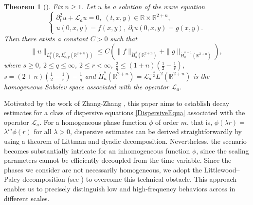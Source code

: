 \documentclass[a4paper,11pt, reqno]{amsart}
\numberwithin{equation}{section}
\theoremstyle{plain}
\newtheorem{theorem}{Theorem}[section]
\theoremstyle{definition}
\theoremstyle{remark}
\begin{document}
\begin{theorem}[\cite{Zhang-Zhang}] \label{wave-Strichartz} Fix $n\geq1$. Let $u$ be a solution of the wave equation 
\begin{equation}\label{Schrodinger}
	\begin{cases}	\partial^2_tu+\mathcal{L}_a u=0,\; (t,x,y)\in\mathbb{R}\times\mathbb{R}^{2+n},\\
	u(0,x,y)=f(x,y),\;\partial_tu(0,x,y)=g(x,y).
	\end{cases}
	\end{equation}
Then there exists a constant $C>0$ such that
\begin{equation*}
\|u\|_{L_t^q(\mathbb{R},L_{x,y}^r(\mathbb{R}^{2+n}))}\leq C\left(\|f\|_{\dot{H}_a^s(\mathbb{R}^{2+n})}+\|g\|_{\dot{H}_a^{s-1}(\mathbb{R}^{2+n})}\right),
\end{equation*}
where $s\geq0$, $2\leq q\leq \infty$, $2\leq r<\infty$, $\frac{2}{q}\leq (1+n)\left(\frac{1}{2}-\frac{1}{r}\right)$, $s=(2+n)\left(\frac{1}{2}-\frac{1}{r}\right)-\frac{1}{q}$ and $\dot{H}_a^s(\mathbb{R}^{2+n})=\mathcal{L}_a^{-\frac{s}{2}}L^2(\mathbb{R}^{2+n})$ 
 is the homogeneous Sobolev space associated with the operator $\mathcal{L}_a$.
\end{theorem}

Motivated by the work of Zhang-Zhang \cite{Zhang-Zhang}, this paper aims to establish decay estimates for a class of dispersive equations \eqref{DispersiveEqua} associated with the operator $\mathcal{L}_a$. For a homogeneous phase function $\phi$ of order $m$, that is, $\phi(\lambda r)=$ $\lambda^m \phi(r)$ for all $ \lambda>0$, dispersive estimates can be derived straightforwardly by using a theorem of Littman and dyadic decomposition. Nevertheless, the scenario becomes substantially intricate for an inhomogeneous function $\phi$, since the scaling parameters cannot be efficiently decoupled from the time variable. Since the phases we consider are not necessarily homogeneous, we adopt the Littlewood–Paley decomposition (see \cite{GPW2008}) to overcome this technical obstacle. This approach enables us to precisely distinguish low and high-frequency behaviors across in different scales.
\end{document}
